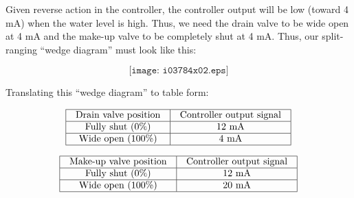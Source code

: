 \vskip 10pt

Given reverse action in the controller, the controller output will be low (toward 4 mA) when the water level is high.  Thus, we need the drain valve to be wide open at 4 mA and the make-up valve to be completely shut at 4 mA.  Thus, our split-ranging ``wedge diagram'' must look like this:

$$\texttt{[image: i03784x02.eps]}$$

Translating this ``wedge diagram'' to table form:


$$\vbox{\offinterlineskip
\halign{\strut
\vrule \quad\hfil # \ \hfil & 
\vrule \quad\hfil # \ \hfil \vrule \cr
\noalign{\hrule}
%
Drain valve position & Controller output signal \cr
%
\noalign{\hrule}
%
Fully shut (0\%) & 12 mA \cr
%
\noalign{\hrule}
%
Wide open (100\%) & 4 mA \cr
%
\noalign{\hrule}
} %
}$$ %


$$\vbox{\offinterlineskip
\halign{\strut
\vrule \quad\hfil # \ \hfil & 
\vrule \quad\hfil # \ \hfil \vrule \cr
\noalign{\hrule}
%
Make-up valve position & Controller output signal \cr
%
\noalign{\hrule}
%
Fully shut (0\%) & 12 mA \cr
%
\noalign{\hrule}
%
Wide open (100\%) & 20 mA \cr
%
\noalign{\hrule}
} %
}$$ %





